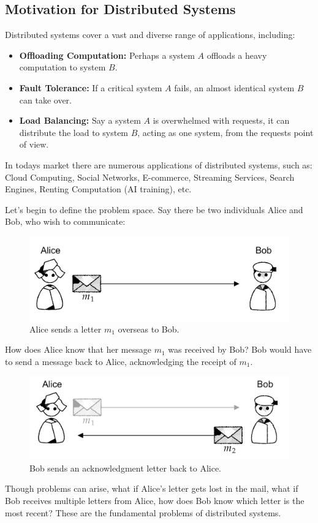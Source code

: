 \newpage 

\noindent
\subsection{Motivation for Distributed Systems}

\noindent
Distributed systems cover a vast and diverse range of applications, including:
\begin{itemize}
    \item \textbf{Offloading Computation:} Perhaps a system $A$ offloads a heavy computation to system $B$.
    \item \textbf{Fault Tolerance:} If a critical system $A$ fails, an almost identical system $B$ can take over.
    \item \textbf{Load Balancing:} Say a system $A$ is overwhelmed with requests, it can distribute the load to system $B$, acting as 
    one system, from the requests point of view.
\end{itemize}
In todays market there are numerous applications of distributed systems, such as:
Cloud Computing, Social Networks, E-commerce, Streaming Services, Search Engines, Renting Computation (AI training), etc.

Let's begin to define the problem space. Say there be 
two individuals Alice and Bob, who wish to communicate:\\
\begin{figure}[h]
    \centering
    \includegraphics[width=.8\textwidth]{./Sections/high/com.png}
    \caption{Alice sends a letter $m_1$ overseas to Bob.}
\end{figure}

\noindent
How does Alice know that her message $m_1$ was received by Bob? Bob 
would have to send a message back to Alice, acknowledging the receipt of $m_1$.

\begin{figure}[h]
    \centering
    \includegraphics[width=.8\textwidth]{./Sections/high/com_2.png}
    \caption{Bob sends an acknowledgment letter back to Alice.}
\end{figure}
    
\noindent
Though problems can arise, what if Alice's letter gets lost in the mail, what if Bob receives multiple 
letters from Alice, how does Bob know which letter is the most recent? These are the fundamental problems 
of distributed systems.
